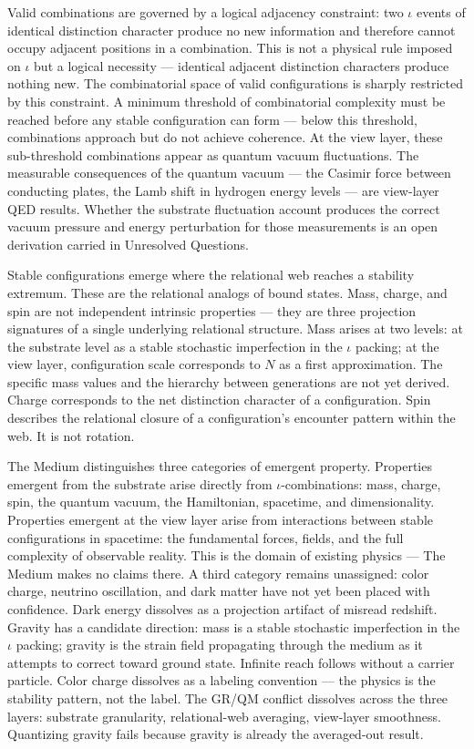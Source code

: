 \documentclass[11pt,letterpaper]{article}
\begin{document}
Valid combinations are governed by a logical adjacency constraint: two \(\iota\) events of identical distinction character produce no new information and therefore cannot occupy adjacent positions in a combination. This is not a physical rule imposed on \(\iota\) but a logical necessity --- identical adjacent distinction characters produce nothing new. The combinatorial space of valid configurations is sharply restricted by this constraint. A minimum threshold of combinatorial complexity must be reached before any stable configuration can form --- below this threshold, combinations approach but do not achieve coherence. At the view layer, these sub-threshold combinations appear as quantum vacuum fluctuations. The measurable consequences of the quantum vacuum --- the Casimir force between conducting plates, the Lamb shift in hydrogen energy levels --- are view-layer QED results. Whether the substrate fluctuation account produces the correct vacuum pressure and energy perturbation for those measurements is an open derivation carried in Unresolved Questions.

Stable configurations emerge where the relational web reaches a stability extremum. These are the relational analogs of bound states. Mass, charge, and spin are not independent intrinsic properties --- they are three projection signatures of a single underlying relational structure. Mass arises at two levels: at the substrate level as a stable stochastic imperfection in the \(\iota\) packing; at the view layer, configuration scale corresponds to \(N\) as a first approximation. The specific mass values and the hierarchy between generations are not yet derived. Charge corresponds to the net distinction character of a configuration. Spin describes the relational closure of a configuration's encounter pattern within the web. It is not rotation.

The Medium distinguishes three categories of emergent property. Properties emergent from the substrate arise directly from \(\iota\)-combinations: mass, charge, spin, the quantum vacuum, the Hamiltonian, spacetime, and dimensionality. Properties emergent at the view layer arise from interactions between stable configurations in spacetime: the fundamental forces, fields, and the full complexity of observable reality. This is the domain of existing physics --- The Medium makes no claims there. A third category remains unassigned: color charge, neutrino oscillation, and dark matter have not yet been placed with confidence. Dark energy dissolves as a projection artifact of misread redshift. Gravity has a candidate direction: mass is a stable stochastic imperfection in the \(\iota\) packing; gravity is the strain field propagating through the medium as it attempts to correct toward ground state. Infinite reach follows without a carrier particle. Color charge dissolves as a labeling convention --- the physics is the stability pattern, not the label. The GR/QM conflict dissolves across the three layers: substrate granularity, relational-web averaging, view-layer smoothness. Quantizing gravity fails because gravity is already the averaged-out result.
\end{document}
